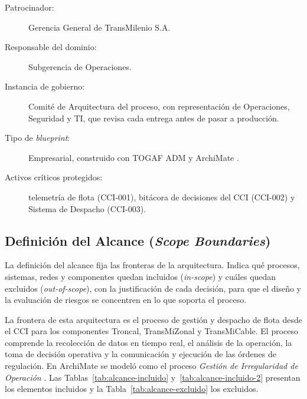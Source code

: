 \begin{description}
	\item[Patrocinador:] Gerencia General de TransMilenio S.A.
	\item[Responsable del dominio:] Subgerencia de Operaciones.
	\item[Instancia de gobierno:] Comité de Arquitectura del proceso, con representación de Operaciones, Seguridad y TI, que revisa cada entrega antes de pasar a producción.
	\item[Tipo de \textit{blueprint}:] Empresarial, construido con TOGAF ADM y ArchiMate \parencite{togaf2022,archimate2022}.
	\item[Activos críticos protegidos:] telemetría de flota (CCI-001), bitácora de decisiones del CCI (CCI-002) y Sistema de Despacho (CCI-003).
\end{description}


\subsection{Definición del Alcance (\textit{Scope Boundaries})}

La definición del alcance fija las fronteras de la arquitectura. Indica qué procesos, sistemas, redes y componentes quedan incluidos (\textit{in-scope}) y cuáles quedan excluidos (\textit{out-of-scope}), con la justificación de cada decisión, para que el diseño y la evaluación de riesgos se concentren en lo que soporta el proceso.

La frontera de esta arquitectura es el proceso de gestión y despacho de flota desde el CCI para los componentes Troncal, TransMiZonal y TransMiCable. El proceso comprende la recolección de datos en tiempo real, el análisis de la operación, la toma de decisión operativa y la comunicación y ejecución de las órdenes de regulación. En ArchiMate se modeló como el proceso \textit{Gestión de Irregularidad de Operación} \parencite{archimate2022,modeloArchimateCCI2026}. Las Tablas~\ref{tab:alcance-incluido} y~\ref{tab:alcance-incluido-2} presentan los elementos incluidos y la Tabla~\ref{tab:alcance-excluido} los excluidos.

